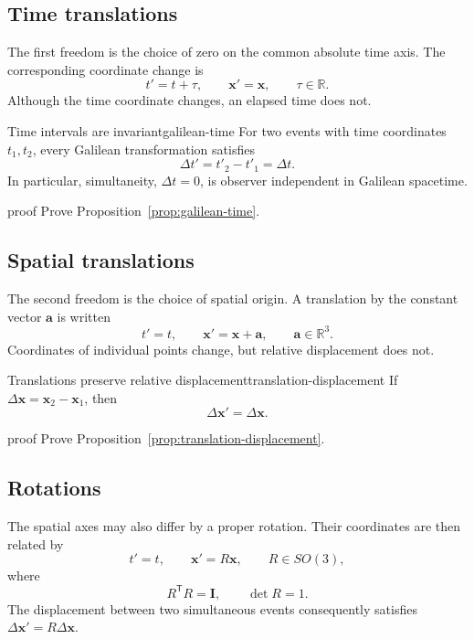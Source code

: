 \documentclass[11pt,a4paper]{article}
\newcommand{\vect}[1]{\bm{#1}}
\newcommand{\R}{\mathbb{R}}
\newcommand{\id}{\mathbf{I}}
\newcommand{\transpose}{\mathsf{T}}
\begin{document}
\subsection{Time translations}

The first freedom is the choice of zero on the common absolute time axis. The
corresponding coordinate change is
\[
  t'=t+\tau,\qquad \vect{x}'=\vect{x},
  \qquad \tau\in\R.
\]
Although the time coordinate changes, an elapsed time does not.

\begin{proposition}{Time intervals are invariant}{galilean-time}
For two events with time coordinates \(t_1,t_2\), every Galilean
transformation satisfies
\[
  \Delta t'=t'_2-t'_1=\Delta t.
\]
In particular, simultaneity, \(\Delta t=0\), is observer independent in
Galilean spacetime.
\end{proposition}

\begin{studentwork}[height=6.0cm]{proof}
Prove Proposition~\ref{prop:galilean-time}.
\end{studentwork}

\subsection{Spatial translations}

The second freedom is the choice of spatial origin. A translation by the
constant vector \(\vect a\) is written
\[
  t'=t,\qquad \vect{x}'=\vect{x}+\vect{a},
  \qquad \vect{a}\in\R^3.
\]
Coordinates of individual points change, but relative displacement does not.

\begin{proposition}{Translations preserve relative displacement}{translation-displacement}
If \(\Delta\vect{x}=\vect{x}_2-\vect{x}_1\), then
\[
  \Delta\vect{x}'=\Delta\vect{x}.
\]
\end{proposition}

\begin{studentwork}[height=4.6cm]{proof}
Prove Proposition~\ref{prop:translation-displacement}.
\end{studentwork}

\subsection{Rotations}

The spatial axes may also differ by a proper rotation. Their coordinates are
then related by
\[
  t'=t,\qquad \vect{x}'=R\vect{x},
  \qquad R\in SO(3),
\]
where
\[
  R^{\transpose}R=\id,\qquad \det R=1.
\]
The displacement between two simultaneous events consequently satisfies
\(\Delta\vect{x}'=R\Delta\vect{x}\).
\end{document}
